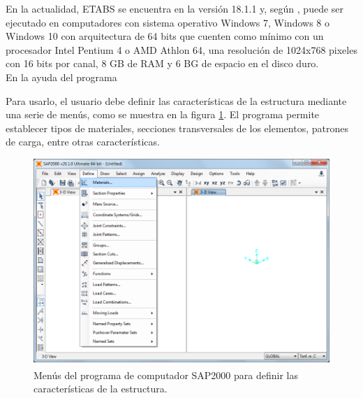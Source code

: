 En la actualidad, ETABS se encuentra en la versión 18.1.1 y, según \cite{ETABS2020systemrequirements}, puede ser ejecutado en computadores con sistema operativo Windows 7, Windows 8 o Windows 10 con arquitectura de 64 bits que cuenten como mínimo con un procesador Intel Pentium 4 o AMD Athlon 64, una resolución de 1024x768 pixeles con 16 bits por canal, 8 GB de RAM y 6 BG de espacio en el disco duro.\\

En la ayuda del programa 

Para usarlo, el usuario debe definir las características de la estructura mediante una serie de menús, como se muestra en la figura \ref{fig:sap2000_toolbar}. El programa permite establecer tipos de materiales, secciones transversales de los elementos, patrones de carga, entre otras características.


\begin{figure}[ht]
    \centering
    \includegraphics[width=1\textwidth]{metodologia/sap2000_toolbar.png}
    \caption{Menús del programa de computador SAP2000\textsuperscript{\textregistered} para definir las características de la estructura.}
    \label{fig:sap2000_toolbar}
\end{figure}


